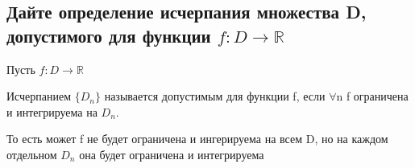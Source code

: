 
\subsection{Дайте определение исчерпания множества D, допустимого для функции $f : D \rightarrow \mathbb{R}$}
Пусть $f : D \rightarrow \mathbb{R}$

Исчерпанием $\{D_n\}$ называется допустимым для функции f, если $\forall$n f ограничена и интегрируема на $D_n$.

То есть может f не будет ограничена и ингерируема на всем D, но на каждом отдельном $D_n$ она будет  ограничена и интегрируема

